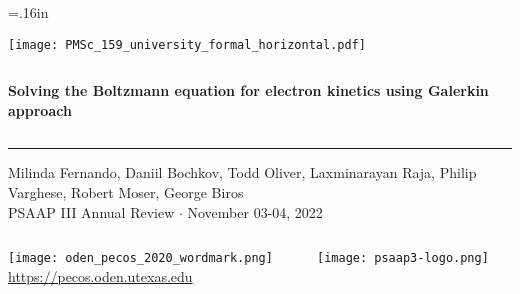 \documentclass[mathserif, aspectratio=169]{beamer}
\begin{document}


\hoffset=.16in

\begin{frame}[plain,t]{}
\makeatletter
\texttt{[image: PMSc\_159\_university\_formal\_horizontal.pdf]} \newline
\begin{columns}[T,onlytextwidth]
{\bf \color{burntorange} \selectfont 
Solving the Boltzmann equation for electron kinetics using Galerkin approach
}
\end{columns}
\vspace*{.15cm}
\rule{.8\textwidth}{0.6pt} \newline

\vspace*{0.05cm}
{\selectfont
  { \scriptsize
    Milinda Fernando, Daniil Bochkov, Todd Oliver, Laxminarayan Raja, Philip Varghese, Robert Moser, George Biros  \\
  }
  {\color{burntorange} \tiny
    PSAAP III Annual Review $\cdot$ November 03-04, 2022
  }
}

\vspace*{1cm}
\begin{columns}
\begin{column}{0.8\linewidth}
\texttt{[image: oden\_pecos\_2020\_wordmark.png]}\\
{\scriptsize \url{https://pecos.oden.utexas.edu}}
\end{column}

\begin{column}{0.2\linewidth}
\texttt{[image: psaap3-logo.png]}
\end{column}
\end{columns}

\end{frame}
\hoffset=0in
\end{document}
